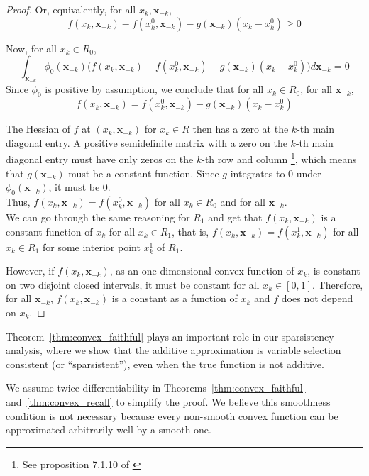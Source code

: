 \begin{proof}
Or, equivalently, for all $x_k, \mathbf{x}_{-k}$, 
\[
f(x_k, \mathbf{x}_{-k}) - f(x^0_k, \mathbf{x}_{-k}) - g(\mathbf{x}_{-k}) (x_k-x^0_k) \geq 0
\]

Now, for all $x_k \in R_0$, 
\[
\int_{\mathbf{x}_{-k}} \phi_0(\mathbf{x}_{-k}) 
     \Big(f(x_k, \mathbf{x}_{-k}) - f(x^0_k, \mathbf{x}_{-k}) 
     - g(\mathbf{x}_{-k}) (x_k - x^0_k) \Big) d\mathbf{x}_{-k} = 0
\]
Since $\phi_0$ is positive by assumption, we conclude that for all $x_k \in R_0$, for all $\mathbf{x}_{-k}$, 
$$
f(x_k, \mathbf{x}_{-k}) = f(x^0_k, \mathbf{x}_{-k}) - g(\mathbf{x}_{-k}) (x_k - x^0_k)
$$

The Hessian of $f$ at $(x_k, \mathbf{x}_{-k})$ for $x_k \in R$ then has a zero at the $k$-th main diagonal entry. A positive semidefinite matrix with a zero on the $k$-th main diagonal entry must have only zeros on the $k$-th row and column \footnote{ See proposition 7.1.10 of \citet{HJ90}}, which means that $g(\mathbf{x}_{-k})$ must be a constant function. Since $g$ integrates to 0 under $\phi_0(\mathbf{x}_{-k})$, it must be 0.\\

Thus, $f(x_k, \mathbf{x}_{-k}) = f(x^0_k, \mathbf{x}_{-k})$ for all $x_k \in R_0$ and for all $\mathbf{x}_{-k}$.\\

We can go through the same reasoning for $R_1$  and get that $f(x_k, \mathbf{x}_{-k})$ is a constant function of $x_k$ for all $x_k \in R_1$, that is, $f(x_k, \mathbf{x}_{-k}) = f(x^1_k, \mathbf{x}_{-k})$ for all $x_k \in R_1$ for some interior point $x^1_k$ of $R_1$.

However, if $f(x_k, \mathbf{x}_{-k})$, as an one-dimensional convex function of $x_k$, is constant on two disjoint closed intervals, it must be constant for all $x_k \in [0,1]$. Therefore, for all $\mathbf{x}_{-k}$, $f(x_k, \mathbf{x}_{-k})$ is a constant as a function of $x_k$ and $f$ does not depend on $x_k$.

\end{proof}

Theorem~\ref{thm:convex_faithful} plays an important role in our
sparsistency analysis, where we show that the additive
approximation is variable selection consistent (or ``sparsistent''), even when the true function is not
additive.

\begin{remark}
  We assume twice differentiability in
  Theorems~\ref{thm:convex_faithful} and~\ref{thm:convex_recall} to simplify the proof. 
  We believe
  this smoothness condition is not necessary because every non-smooth
  convex function can be approximated arbitrarily well by a smooth
  one.  
\end{remark}

